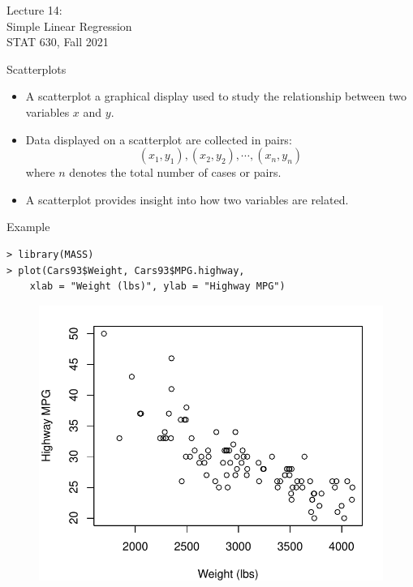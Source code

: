 \documentclass[10pt]{beamer}
\begin{document}
\begin{frame}
\large Lecture 14:\\ 
Simple Linear Regression\\
STAT 630, Fall 2021
\end{frame}

\begin{frame}{Scatterplots}
\begin{itemize}
\item A scatterplot a graphical display used to study the relationship between two variables $x$ and $y$.  
\vspace{5pt}
\item Data displayed on a scatterplot are collected in pairs:
$$(x_1, y_1), (x_2, y_2), \cdots, (x_n, y_n)$$
where $n$ denotes the total number of cases or pairs.
\vspace{5pt}
\item A scatterplot provides insight into how two variables are related. 
\end{itemize}
\end{frame}

\begin{frame}[fragile]{Example}
\small
\begin{verbatim}
> library(MASS)
> plot(Cars93$Weight, Cars93$MPG.highway, 
    xlab = "Weight (lbs)", ylab = "Highway MPG")
\end{verbatim}
\begin{figure}
\includegraphics[scale=0.5]{figure/mpg_scatter.pdf}
\end{figure}
\end{frame}
\end{document}
